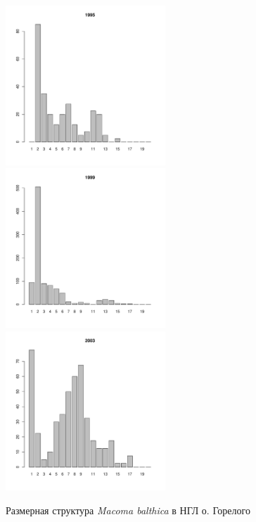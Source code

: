 \documentclass[12pt, a4paper]{article}
\begin{document}
\begin{figure}[h]
\begin{multicols}{3}
\hfill
\includegraphics[width=60mm]{../White_Sea/Luvenga_Goreliy/low_1995_.pdf}
\hfill
\includegraphics[width=60mm]{../White_Sea/Luvenga_Goreliy/low_1999_.pdf}
\hfill
\includegraphics[width=60mm]{../White_Sea/Luvenga_Goreliy/low_2003_.pdf}
\end{multicols}


\caption{Размерная структура {\it Macoma balthica} в НГЛ о. Горелого}
\label{ris:size_str_Goreliy_low}
\end{figure}
\end{document}
